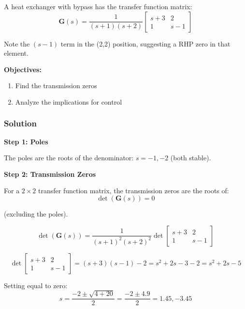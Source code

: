 A heat exchanger with bypass has the transfer function matrix:
\begin{equation}
\mathbf{G}(s) = \frac{1}{(s+1)(s+2)}\begin{bmatrix} s+3 & 2 \\ 1 & s-1 \end{bmatrix}
\end{equation}

Note the $(s-1)$ term in the (2,2) position, suggesting a RHP zero in that element.

\textbf{Objectives:}
\begin{enumerate}
\item Find the transmission zeros
\item Analyze the implications for control
\end{enumerate}

\subsubsection{Solution}

\textbf{Step 1: Poles}

The poles are the roots of the denominator: $s = -1, -2$ (both stable).

\textbf{Step 2: Transmission Zeros}

For a $2 \times 2$ transfer function matrix, the transmission zeros are the roots of:
\begin{equation}
\det(\mathbf{G}(s)) = 0
\end{equation}

(excluding the poles).

\begin{equation}
\det(\mathbf{G}(s)) = \frac{1}{(s+1)^2(s+2)^2}\det\begin{bmatrix} s+3 & 2 \\ 1 & s-1 \end{bmatrix}
\end{equation}

\begin{equation}
\det\begin{bmatrix} s+3 & 2 \\ 1 & s-1 \end{bmatrix} = (s+3)(s-1) - 2 = s^2 + 2s - 3 - 2 = s^2 + 2s - 5
\end{equation}

Setting equal to zero:
\begin{equation}
s = \frac{-2 \pm \sqrt{4 + 20}}{2} = \frac{-2 \pm 4.9}{2} = 1.45, -3.45
\end{equation}

